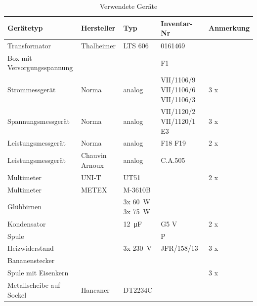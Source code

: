 \documentclass[12pt,english,ngerman]{scrartcl}
\begin{document}
\begin{table}[H]
	\caption{Verwendete Geräte}
	\begin{tabular}{|l|l|l|l|l|}
	\hline
	\textbf{Gerätetyp}          & \textbf{Hersteller} & \textbf{Typ} & \textbf{Inventar-Nr}               & \textbf{Anmerkung} \\ \hline
	Transformator               & Thalheimer          & LTS 606      & 0161469                            &                    \\ \hline
	Box mit Versorgungsspannung &                     &              & F1                                 &                    \\ \hline
	Strommessgerät              & Norma               & analog       & VII/1106/9  VII/1106/6  VII/1106/3 & 3 x                \\ \hline
	Spannungsmessgerät          & Norma               & analog       & VII/1120/2  VII/1120/1  E3         & 3 x                \\ \hline
	Leistungsmessgerät          & Norma               & analog       & F18 F19                            & 2 x                \\ \hline
	Leistungsmessgerät          & Chauvin Arnoux      & analog       & C.A.505                            &                    \\ \hline
	Multimeter                  & UNI-T               & UT51         &                                    & 2 x                \\ \hline
	Multimeter                  & METEX               & M-3610B      &                                    &                    \\ \hline
	Glühbirnen                  &                     & 3x \SI{60}{\watt} 3x \SI{75}{\watt}      &                                    &                    \\ \hline
	Kondensator                 &                     & \SI{12}{\micro\farad}   & G5 V                               & 2 x                \\ \hline
	Spule                       &                     &              & P                                  &                    \\ \hline
	Heizwiderstand              &                     & 3x \SI{230}{\volt}        & JFR/158/13                         & 3 x                \\ \hline
	Bananenstecker              &                     &              &                                    &                    \\ \hline
	Spule mit Eisenkern         &                     &              &                                    & 3 x                \\ \hline
	Metallscheibe auf Sockel    &        Hancaner     &   DT2234C    &                                    &                    \\ \hline
	\end{tabular}
	\label{tab:gerate}
	\end{table}
\end{document}
